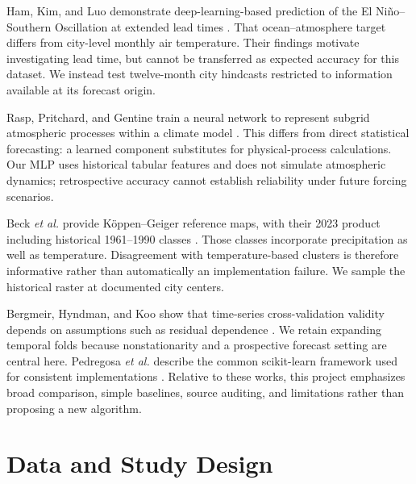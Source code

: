 \documentclass[conference]{IEEEtran}
\begin{document}
Ham, Kim, and Luo demonstrate deep-learning-based prediction of the El Ni\~no--Southern Oscillation at extended lead times \cite{ham}. That ocean--atmosphere target differs from city-level monthly air temperature. Their findings motivate investigating lead time, but cannot be transferred as expected accuracy for this dataset. We instead test twelve-month city hindcasts restricted to information available at its forecast origin.

Rasp, Pritchard, and Gentine train a neural network to represent subgrid atmospheric processes within a climate model \cite{rasp}. This differs from direct statistical forecasting: a learned component substitutes for physical-process calculations. Our MLP uses historical tabular features and does not simulate atmospheric dynamics; retrospective accuracy cannot establish reliability under future forcing scenarios.

Beck \emph{et al.} provide K\"oppen--Geiger reference maps, with their 2023 product including historical 1961--1990 classes \cite{beck2018,beck2023}. Those classes incorporate precipitation as well as temperature. Disagreement with temperature-based clusters is therefore informative rather than automatically an implementation failure. We sample the historical raster at documented city centers.

Bergmeir, Hyndman, and Koo show that time-series cross-validation validity depends on assumptions such as residual dependence \cite{bergmeir}. We retain expanding temporal folds because nonstationarity and a prospective forecast setting are central here. Pedregosa \emph{et al.} describe the common scikit-learn framework used for consistent implementations \cite{pedregosa}. Relative to these works, this project emphasizes broad comparison, simple baselines, source auditing, and limitations rather than proposing a new algorithm.

\section{Data and Study Design}
\end{document}
